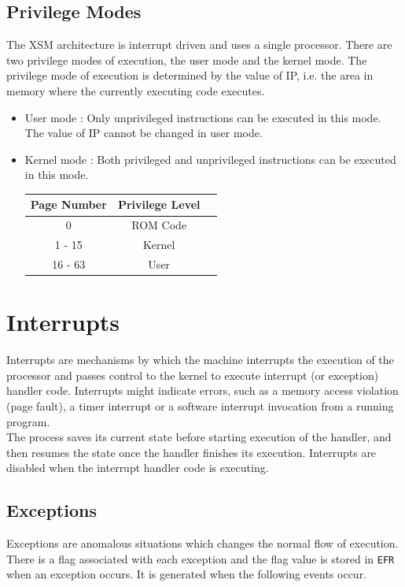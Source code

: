 \documentclass[11pt]{report}
\begin{document}
\section{Privilege Modes}
\label{sec:priv_modes}
The XSM architecture is interrupt driven and uses a single processor. There are two privilege modes of execution, the user mode and the kernel mode. The privilege mode of execution is determined by the value of IP, i.e. the area in memory where the currently executing code executes. 


\begin{itemize}
\item User mode : Only unprivileged instructions can be executed in this mode. The value of IP cannot be changed in user mode.

\item Kernel mode : Both privileged and unprivileged instructions can be executed in this mode. 

\begin{center}
\begin{tabular}{|c|c|c|}
\hline \textbf{Page Number} & \textbf{Privilege Level} \\ 
\hline 0 & ROM Code \\ 
\hline 1 - 15 & Kernel \\ 
\hline 16 - 63 & User  \\ 

\hline
\end{tabular} 
\end{center}

\end{itemize}

\chapter{Interrupts}
\label{sec:int}

Interrupts are mechanisms by which the machine interrupts the execution of the processor and passes control to the kernel to execute interrupt (or exception) handler code. Interrupts might indicate errors, such as a memory access violation (page fault), a timer interrupt or a software interrupt invocation from a running program. \\

The process saves its current state before starting execution of the handler, and then resumes the state once the handler finishes its execution. Interrupts are disabled when the interrupt handler code is executing. 


\section{Exceptions}
\label{excpetion}
Exceptions are anomalous situations which changes the normal flow of execution. There is a flag associated with each exception and the flag value is stored in \texttt{EFR} when an exception occurs. It is generated when the following events occur.
\end{document}
